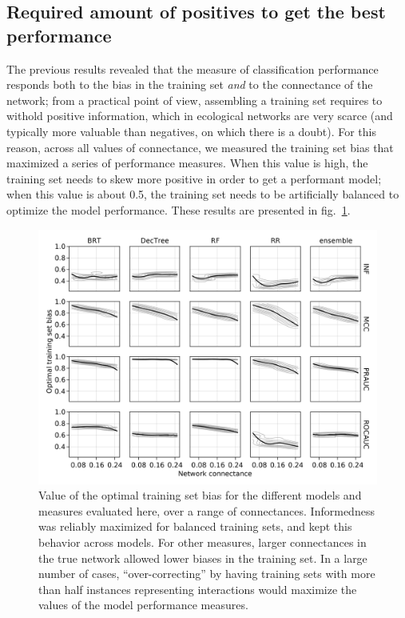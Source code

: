 \documentclass[11pt]{article}
\makeatletter
\def\maxwidth{\ifdim\Gin@nat@width>\linewidth\linewidth
\else\Gin@nat@width\fi}
\let\Oldincludegraphics\includegraphics
\renewcommand{\includegraphics}[1]{\Oldincludegraphics[width=\maxwidth]{#1}}
\makeatother
\begin{document}
\hypertarget{required-amount-of-positives-to-get-the-best-performance}{%
\subsection{Required amount of positives to get the best
performance}\label{required-amount-of-positives-to-get-the-best-performance}}

The previous results revealed that the measure of classification
performance responds both to the bias in the training set \emph{and} to
the connectance of the network; from a practical point of view,
assembling a training set requires to withold positive information,
which in ecological networks are very scarce (and typically more
valuable than negatives, on which there is a doubt). For this reason,
across all values of connectance, we measured the training set bias that
maximized a series of performance measures. When this value is high, the
training set needs to skew more positive in order to get a performant
model; when this value is about 0.5, the training set needs to be
artificially balanced to optimize the model performance. These results
are presented in fig.~\ref{fig:optimbias}.

\begin{figure}
\hypertarget{fig:optimbias}{%
\centering
\includegraphics{figures/optim_bias.png}
\caption{Value of the optimal training set bias for the different models
and measures evaluated here, over a range of connectances. Informedness
was reliably maximized for balanced training sets, and kept this
behavior across models. For other measures, larger connectances in the
true network allowed lower biases in the training set. In a large number
of cases, ``over-correcting'' by having training sets with more than
half instances representing interactions would maximize the values of
the model performance measures.}\label{fig:optimbias}
}
\end{figure}
\end{document}
